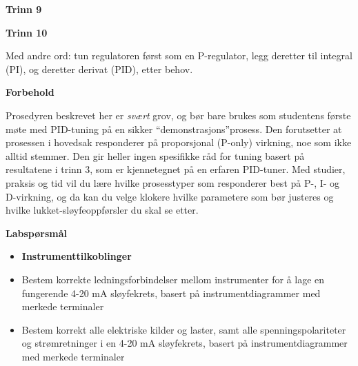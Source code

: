 \vskip 10pt

\noindent
{\bf Trinn 9}


\vskip 10pt

\noindent
{\bf Trinn 10}

 Med andre ord: tun regulatoren først som en P-regulator, legg deretter til integral (PI), og deretter derivat (PID), etter behov.

\vskip 10pt


\centerline{\bf Forbehold}

\vskip 10pt

Prosedyren beskrevet her er {\it svært} grov, og bør bare brukes som studentens første møte med PID-tuning på en sikker ``demonstrasjons''prosess. Den forutsetter at prosessen i hovedsak responderer på proporsjonal (P-only) virkning, noe som ikke alltid stemmer. Den gir heller ingen spesifikke råd for tuning basert på resultatene i trinn 3, som er kjennetegnet på en erfaren PID-tuner. Med studier, praksis og tid vil du lære hvilke prosesstyper som responderer best på P-, I- og D-virkning, og da kan du velge klokere hvilke parametere som bør justeres og hvilke lukket-sløyfeoppførsler du skal se etter.

\vskip 10pt





\vfil \eject

\noindent
{\bf Labspørsmål}

\vskip 5pt

\begin{itemize}
\item{} {\bf Instrumenttilkoblinger}
\item{} Bestem korrekte ledningsforbindelser mellom instrumenter for å lage en fungerende 4-20 mA sløyfekrets, basert på instrumentdiagrammer med merkede terminaler
\item{} Bestem korrekt alle elektriske kilder og laster, samt alle spenningspolariteter og strømretninger i en 4-20 mA sløyfekrets, basert på instrumentdiagrammer med merkede terminaler
\end{itemize}

\filbreak

